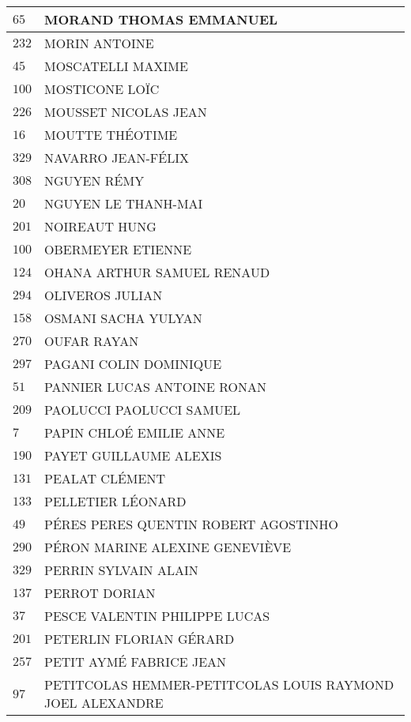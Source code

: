 \begin{xltabular}{\linewidth}{|l|X|}
    \hline
    $65$ & MORAND THOMAS EMMANUEL \\
    \hline
    $232$ & MORIN ANTOINE \\
    \hline
    $45$ & MOSCATELLI MAXIME \\
    \hline
    $100$ & MOSTICONE LOÏC \\
    \hline
    $226$ & MOUSSET NICOLAS JEAN \\
    \hline
    $16$ & MOUTTE THÉOTIME \\
    \hline
    $329$ & NAVARRO JEAN-FÉLIX \\
    \hline
    $308$ & NGUYEN RÉMY \\
    \hline
    $20$ & NGUYEN LE THANH-MAI \\
    \hline
    $201$ & NOIREAUT HUNG \\
    \hline
    $100$ & OBERMEYER ETIENNE \\
    \hline
    $124$ & OHANA ARTHUR SAMUEL RENAUD \\
    \hline
    $294$ & OLIVEROS JULIAN \\
    \hline
    $158$ & OSMANI SACHA YULYAN \\
    \hline
    $270$ & OUFAR RAYAN \\
    \hline
    $297$ & PAGANI COLIN DOMINIQUE \\
    \hline
    $51$ & PANNIER LUCAS ANTOINE RONAN \\
    \hline
    $209$ & PAOLUCCI PAOLUCCI SAMUEL \\
    \hline
    $7$ & PAPIN CHLOÉ EMILIE ANNE \\
    \hline
    $190$ & PAYET GUILLAUME ALEXIS \\
    \hline
    $131$ & PEALAT CLÉMENT \\
    \hline
    $133$ & PELLETIER LÉONARD \\
    \hline
    $49$ & PÉRES PERES QUENTIN ROBERT AGOSTINHO \\
    \hline
    $290$ & PÉRON MARINE ALEXINE GENEVIÈVE \\
    \hline
    $329$ & PERRIN SYLVAIN ALAIN \\
    \hline
    $137$ & PERROT DORIAN \\
    \hline
    $37$ & PESCE VALENTIN PHILIPPE LUCAS \\
    \hline
    $201$ & PETERLIN FLORIAN GÉRARD \\
    \hline
    $257$ & PETIT AYMÉ FABRICE JEAN \\
    \hline
    $97$ & PETITCOLAS HEMMER-PETITCOLAS LOUIS RAYMOND JOEL ALEXANDRE \\

\end{xltabular}
